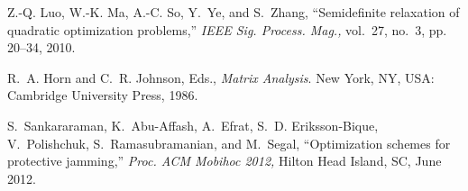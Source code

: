 \documentclass[journal,,draftclsnofoot letterpaper, onecolumn]{IEEEtran}
\begin{document}
\begin{thebibliography}{99}
 Z.-Q. Luo, W.-K. Ma, A.-C. So, Y.~Ye, and S.~Zhang, ``Semidefinite relaxation of quadratic optimization problems,'' \textit{IEEE Sig. Process. Mag.,} vol.~27, no.~3, pp. 20--34, 2010.

 R.~A. Horn and C.~R. Johnson, Eds., \textit{Matrix Analysis}. New York, NY, USA: Cambridge University Press, 1986.

 S.~Sankararaman, K.~Abu-Affash, A.~Efrat, S.~D. Eriksson-Bique, V.~Polishchuk, S.~Ramasubramanian, and M.~Segal, ``Optimization schemes for protective jamming,'' \textit{Proc. ACM Mobihoc 2012,} Hilton Head Island, SC, June 2012.

\end{thebibliography}
\end{document}
